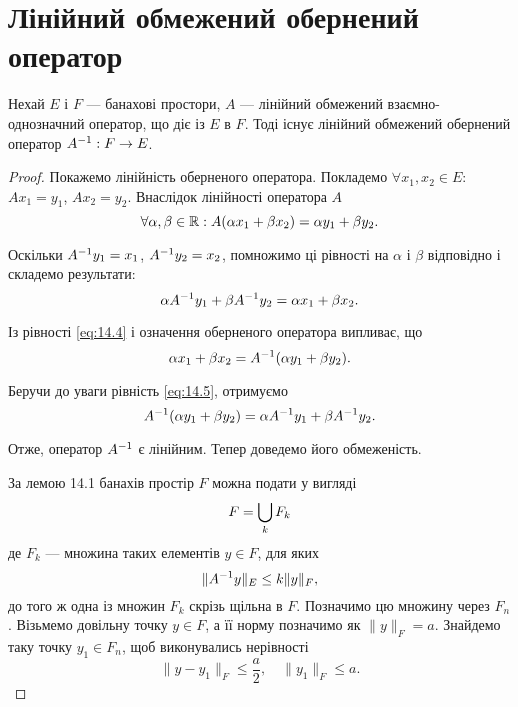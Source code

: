\section{Лінійний обмежений обернений оператор}

\begin{theorem}
Нехай $E$ і $F$ --- банахові простори,
$A$ --- лінійний обмежений взаємно-однозначний оператор,
що діє із $E$ в $F$.
Тоді існує лінійний обмежений обернений
оператор $A^{-1}: F \to E$.
\end{theorem}

\begin{proof}
Покажемо лінійність оберненого оператора.
Покладемо $\forall x_1, x_2 \in E$: $A x_1 = y_1$, $A x_2 = y_2$.
Внаслідок лінійності оператора $A$
\begin{equation}
    \label{eq:14.4}
    \forall \alpha, \beta \in \mathbb{R}:
    A(\alpha x_1 + \beta x_2) =
    \alpha y_1 + \beta y_2.
\end{equation}

Оскільки $A^{-1} y_1 = x_1$, $A^{-1} y_2 = x_2$, помножимо ці рівності на
$\alpha$ і $\beta$ відповідно і складемо результати:
\begin{equation}
    \label{eq:14.5}
    \alpha A^{-1} y_1 + \beta A^{-1} y_2 =
    \alpha x_1 + \beta x_2.
\end{equation}

Із рівності \eqref{eq:14.4} і означення оберненого оператора випливає, що
\begin{equation*}
    \alpha x_1 + \beta x_2 = A^{-1} (\alpha y_1 + \beta y_2).
\end{equation*}

Беручи до уваги рівність \eqref{eq:14.5}, отримуємо
\begin{equation*}
    A^{-1} (\alpha y_1 + \beta y_2) = \alpha A^{-1} y_1 + \beta A^{-1} y_2.
\end{equation*}

Отже, оператор $A^{-1}$ є лінійним. Тепер доведемо його обмеженість.

За лемою 14.1 банахів простір $F$ можна подати у вигляді
\begin{equation*}
    F = \operatorname*{\bigcup}_k F_k
\end{equation*}
де $F_k$ --- множина таких елементів $y \in F$, для яких
\begin{equation*}
    \|A^{-1} y\|_E \le k \|y\|_F,
\end{equation*}
до того ж одна із множин $F_k$ скрізь щільна в $F$. Позначимо
цю множину через $F_n$. Візьмемо довільну точку $y \in F$, а її
норму позначимо як $\|y\|_F = a$. Знайдемо таку точку
$y_1 \in F_n$, щоб виконувались нерівності
\begin{equation*}
    \|y - y_1\|_F \le \frac{a}{2}, \quad \|y_1\|_F \le a.
\end{equation*}


\end{proof}
